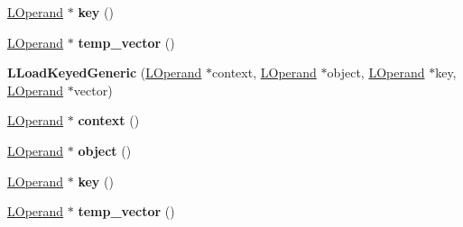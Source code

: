 \begin{DoxyCompactItemize}
\item 
\hyperlink{classv8_1_1internal_1_1_l_operand}{L\+Operand} $\ast$ {\bfseries key} ()\hypertarget{classv8_1_1internal_1_1_l_load_keyed_generic_ad55d2217ba38aa46911c0e797a610388}{}\label{classv8_1_1internal_1_1_l_load_keyed_generic_ad55d2217ba38aa46911c0e797a610388}

\item 
\hyperlink{classv8_1_1internal_1_1_l_operand}{L\+Operand} $\ast$ {\bfseries temp\+\_\+vector} ()\hypertarget{classv8_1_1internal_1_1_l_load_keyed_generic_ac529ed41ee727bf1e320ad6711ce2cff}{}\label{classv8_1_1internal_1_1_l_load_keyed_generic_ac529ed41ee727bf1e320ad6711ce2cff}

\item 
{\bfseries L\+Load\+Keyed\+Generic} (\hyperlink{classv8_1_1internal_1_1_l_operand}{L\+Operand} $\ast$context, \hyperlink{classv8_1_1internal_1_1_l_operand}{L\+Operand} $\ast$object, \hyperlink{classv8_1_1internal_1_1_l_operand}{L\+Operand} $\ast$key, \hyperlink{classv8_1_1internal_1_1_l_operand}{L\+Operand} $\ast$vector)\hypertarget{classv8_1_1internal_1_1_l_load_keyed_generic_a00c3e8047fc556277f4ec4ebc4207cf8}{}\label{classv8_1_1internal_1_1_l_load_keyed_generic_a00c3e8047fc556277f4ec4ebc4207cf8}

\item 
\hyperlink{classv8_1_1internal_1_1_l_operand}{L\+Operand} $\ast$ {\bfseries context} ()\hypertarget{classv8_1_1internal_1_1_l_load_keyed_generic_a522e2bd4a7d1b71a95f891c1fc9a99c8}{}\label{classv8_1_1internal_1_1_l_load_keyed_generic_a522e2bd4a7d1b71a95f891c1fc9a99c8}

\item 
\hyperlink{classv8_1_1internal_1_1_l_operand}{L\+Operand} $\ast$ {\bfseries object} ()\hypertarget{classv8_1_1internal_1_1_l_load_keyed_generic_aadfba9d6286d59cc727bce5ae1b74ee7}{}\label{classv8_1_1internal_1_1_l_load_keyed_generic_aadfba9d6286d59cc727bce5ae1b74ee7}

\item 
\hyperlink{classv8_1_1internal_1_1_l_operand}{L\+Operand} $\ast$ {\bfseries key} ()\hypertarget{classv8_1_1internal_1_1_l_load_keyed_generic_ad55d2217ba38aa46911c0e797a610388}{}\label{classv8_1_1internal_1_1_l_load_keyed_generic_ad55d2217ba38aa46911c0e797a610388}

\item 
\hyperlink{classv8_1_1internal_1_1_l_operand}{L\+Operand} $\ast$ {\bfseries temp\+\_\+vector} ()\hypertarget{classv8_1_1internal_1_1_l_load_keyed_generic_ac529ed41ee727bf1e320ad6711ce2cff}{}\label{classv8_1_1internal_1_1_l_load_keyed_generic_ac529ed41ee727bf1e320ad6711ce2cff}


\end{DoxyCompactItemize}
